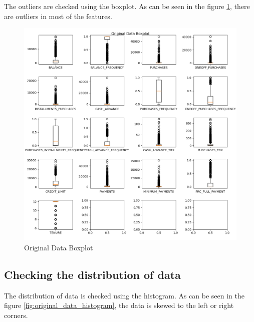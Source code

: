 \documentclass{article}
\begin{document}
        The outliers are checked using the boxplot. As can be seen in the figure \ref{fig:original_data_boxplot}, there are outliers in most of the features.

        \begin{figure}[h]
            \includegraphics[scale=0.475]{original_data_boxplot.png}
            \caption{Original Data Boxplot}
            \label{fig:original_data_boxplot}
        \end{figure}
    \endgroup

    \begingroup
        \subsection {Checking the distribution of data}

        The distribution of data is checked using the histogram. 
        As can be seen in the figure \ref{fig:original_data_histogram}, the data is skewed to the left or right corners.
\end{document}
